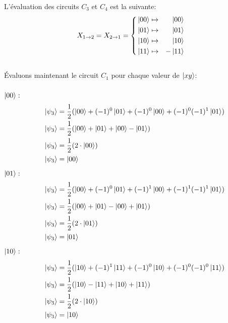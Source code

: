 \documentclass{article}
\begin{document}
L'évaluation des circuits $C_3$ et $C_4$ est la suivante:
\[
X_{1 \rightarrow 2} = X_{2 \rightarrow 1} = 
    \left\{
        \begin{aligned}
            &\ket{00} \mapsto&  \ket{00} \\
            &\ket{01} \mapsto&  \ket{01} \\
            &\ket{10} \mapsto&  \ket{10} \\
            &\ket{11} \mapsto& -\ket{11} \\
        \end{aligned}
    \right .
\] \\
Évaluons maintenant le circuit $C_1$ pour chaque valeur de $\ket{xy}$: \\ \\
$\ket{00}:$ \\
\begin{align*}
&&      \ket{\psi_3} &= \frac{1}{2}(\ket{00} + (-1)^0\ket{01} + (-1)^0\ket{00} + (-1)^0(-1)^1 \ket{01}) \\
&&      \ket{\psi_3} &= \frac{1}{2}(\ket{00} + \ket{01} + \ket{00} - \ket{01}) \\
&&      \ket{\psi_3} &= \frac{1}{2}(2 \cdot \ket{00}) \\
&&      \ket{\psi_3} &= \ket{00} \\
\end{align*}
$\ket{01}:$ \\
\begin{align*}
&&      \ket{\psi_3} &= \frac{1}{2}(\ket{00} + (-1)^0\ket{01} + (-1)^1\ket{00} + (-1)^1(-1)^1 \ket{01}) \\
&&      \ket{\psi_3} &= \frac{1}{2}(\ket{00} + \ket{01} - \ket{00} + \ket{01}) \\
&&      \ket{\psi_3} &= \frac{1}{2}(2 \cdot \ket{01}) \\
&&      \ket{\psi_3} &= \ket{01} \\
\end{align*}
$\ket{10}:$ \\
\begin{align*}
&&      \ket{\psi_3} &= \frac{1}{2}(\ket{10} + (-1)^1\ket{11} + (-1)^0\ket{10} + (-1)^0(-1)^0 \ket{11}) \\
&&      \ket{\psi_3} &= \frac{1}{2}(\ket{10} - \ket{11} + \ket{10} + \ket{11}) \\
&&      \ket{\psi_3} &= \frac{1}{2}(2 \cdot \ket{10}) \\
&&      \ket{\psi_3} &= \ket{10} \\
\end{align*}
\end{document}
